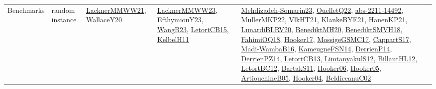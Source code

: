 {\begin{longtable}{lp{3cm}>{\raggedright}p{6cm}>{\raggedright}p{6cm}p{8cm}}
Benchmarks & random instance & \href{papers/LacknerMMWW21.pdf}{LacknerMMWW21}\cite{LacknerMMWW21}, \href{articles/WallaceY20.pdf}{WallaceY20}\cite{WallaceY20} & \href{articles/LacknerMMWW23.pdf}{LacknerMMWW23}\cite{LacknerMMWW23}, \href{papers/EfthymiouY23.pdf}{EfthymiouY23}\cite{EfthymiouY23}, \href{papers/WangB23.pdf}{WangB23}\cite{WangB23}, \href{articles/LetortCB15.pdf}{LetortCB15}\cite{LetortCB15}, \href{articles/KelbelH11.pdf}{KelbelH11}\cite{KelbelH11} & \href{papers/Mehdizadeh-Somarin23.pdf}{Mehdizadeh-Somarin23}\cite{Mehdizadeh-Somarin23}, \href{papers/OuelletQ22.pdf}{OuelletQ22}\cite{OuelletQ22}, \href{articles/abs-2211-14492.pdf}{abs-2211-14492}\cite{abs-2211-14492}, \href{articles/MullerMKP22.pdf}{MullerMKP22}\cite{MullerMKP22}, \href{articles/VlkHT21.pdf}{VlkHT21}\cite{VlkHT21}, \href{papers/KlankeBYE21.pdf}{KlankeBYE21}\cite{KlankeBYE21}, \href{papers/HanenKP21.pdf}{HanenKP21}\cite{HanenKP21}, \href{articles/LunardiBLRV20.pdf}{LunardiBLRV20}\cite{LunardiBLRV20}, \href{articles/BenediktMH20.pdf}{BenediktMH20}\cite{BenediktMH20}, \href{papers/BenediktSMVH18.pdf}{BenediktSMVH18}\cite{BenediktSMVH18}, \href{articles/FahimiOQ18.pdf}{FahimiOQ18}\cite{FahimiOQ18}, \href{papers/Hooker17.pdf}{Hooker17}\cite{Hooker17}, \href{papers/MossigeGSMC17.pdf}{MossigeGSMC17}\cite{MossigeGSMC17}, \href{papers/CappartS17.pdf}{CappartS17}\cite{CappartS17}, \href{papers/Madi-WambaB16.pdf}{Madi-WambaB16}\cite{Madi-WambaB16}, \href{articles/KameugneFSN14.pdf}{KameugneFSN14}\cite{KameugneFSN14}, \href{papers/DerrienP14.pdf}{DerrienP14}\cite{DerrienP14}, \href{papers/DerrienPZ14.pdf}{DerrienPZ14}\cite{DerrienPZ14}, \href{papers/LetortCB13.pdf}{LetortCB13}\cite{LetortCB13}, \href{articles/LimtanyakulS12.pdf}{LimtanyakulS12}\cite{LimtanyakulS12}, \href{papers/BillautHL12.pdf}{BillautHL12}\cite{BillautHL12}, \href{papers/LetortBC12.pdf}{LetortBC12}\cite{LetortBC12}, \href{articles/BartakS11.pdf}{BartakS11}\cite{BartakS11}, \href{articles/Hooker06.pdf}{Hooker06}\cite{Hooker06}, \href{articles/Hooker05.pdf}{Hooker05}\cite{Hooker05}, \href{papers/ArtiouchineB05.pdf}{ArtiouchineB05}\cite{ArtiouchineB05}, \href{papers/Hooker04.pdf}{Hooker04}\cite{Hooker04}, \href{papers/BeldiceanuC02.pdf}{BeldiceanuC02}\cite{BeldiceanuC02}\\

\end{longtable}}
